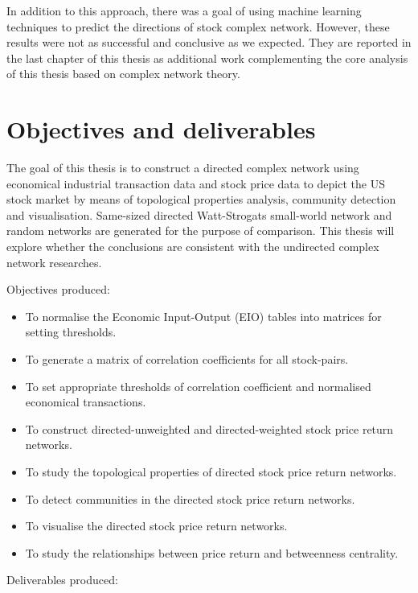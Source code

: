 In addition to this approach, there was a goal of using machine learning techniques to predict the directions of stock complex network. However, these results were not as successful and conclusive as we expected. They are reported in the last chapter of this thesis as additional work complementing the core analysis of this thesis based on complex network theory.


\section{Objectives and deliverables}
The goal of this thesis is to construct a directed complex network using economical industrial transaction data and stock price data to depict the US stock market by means of topological properties analysis, community detection and visualisation. Same-sized directed Watt-Strogats small-world network and random networks are generated for the purpose of comparison. This thesis will explore whether the conclusions are consistent with the undirected complex network researches.

\vline

Objectives produced:

\begin{itemize}
	\item To normalise the Economic Input-Output (EIO) tables into matrices for setting thresholds.
	\item To generate a matrix of correlation coefficients for all stock-pairs.
	\item To set appropriate thresholds of correlation coefficient and normalised economical transactions.
	\item To construct directed-unweighted and directed-weighted stock price return networks.
	\item To study the topological properties of directed stock price return networks.
	\item To detect communities in the directed stock price return networks.
	\item To visualise the directed stock price return networks.
	\item To study the relationships between price return and betweenness centrality.
\end{itemize}

\vline

Deliverables produced:

